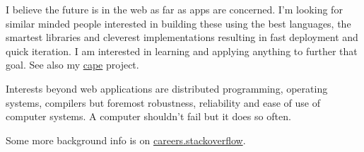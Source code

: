 \documentclass[11pt,a4paper,sans]{moderncv}        %
\begin{document}
I believe the future is in the web as far as apps are concerned. I'm looking for similar minded people interested in building these using the best languages, the smartest libraries and cleverest implementations resulting in fast deployment and quick iteration. I am interested in learning and applying anything to further that goal. See also my \href{http://github.com/michieljoris/cape}{cape} project. 

Interests beyond web applications are distributed programming, operating systems, compilers but foremost robustness, reliability and ease of use of computer systems. A computer shouldn't fail but it does so often.

Some more background info is on \href{http://careers.stackoverflow.com/michieljoris}{careers.stackoverflow}.

\makeletterclosing
\end{document}
